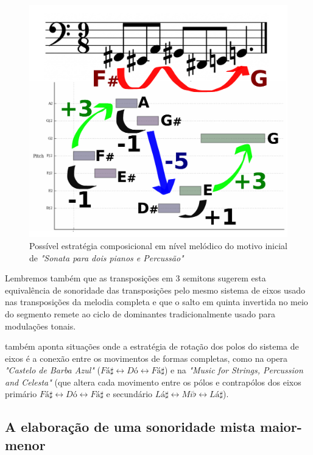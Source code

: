 \documentclass[
	12pt,				%
	openright,			%
	twoside,			%
	a4paper,			%
	english,			%
	french,				%
	spanish,			%
	brazil				%
	]{abntex2}
\begin{document}
\begin{figure}[!h]
	\caption{\label{fig_grafico}Possível estratégia composicional em nível melódico do motivo inicial de \textit{"Sonata para dois pianos e Percussão"}}
	\begin{center}
	    \includegraphics[scale=0.4]{axis/temasonata2P.pdf}
	\end{center}
\end{figure}


Lembremos também que as transposições em 3 semitons sugerem esta equivalência de sonoridade das transposições pelo mesmo sistema de eixos usado nas transposições da melodia completa e que o salto em quinta invertida no meio do segmento remete ao ciclo de dominantes tradicionalmente usado para modulações tonais.


 também aponta situações onde a estratégia de rotação dos polos do sistema de eixos é a conexão entre os movimentos de formas completas, como na opera \textit{"Castelo de Barba Azul"} ($Fá\sharp \leftrightarrow  Dó \leftrightarrow Fá\sharp$) e na \textit{"Music for Strings, Percussion and Celesta" } (que altera cada movimento entre os pólos e contrapólos dos eixos primário $Fá\sharp \leftrightarrow  Dó \leftrightarrow Fá\sharp$ e secundário $Lá\sharp \leftrightarrow  Mi\flat \leftrightarrow Lá\sharp$).


\subsection{A elaboração de uma sonoridade mista maior-menor}
\label{lendvai_maior_menor}
\end{document}
